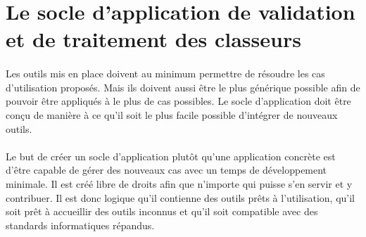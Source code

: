 \section{Le socle d'application de validation et de traitement des classeurs}
\label{sec:spreadsheet-framework}

\paragraph{}
Les outils mis en place doivent au minimum permettre de résoudre les cas d'utilisation proposés.
Mais ils doivent aussi être le plus générique possible afin de pouvoir être appliqués à le plus de cas possibles.
Le socle d'application doit être conçu de manière à ce qu'il soit le plus facile possible d'intégrer de nouveaux outils.

\paragraph{}
Le but de créer un socle d'application plutôt qu'une application concrète est d'être capable de gérer des nouveaux cas avec un temps de développement minimale.
Il est créé libre de droits afin que n'importe qui puisse s'en servir et y contribuer.
Il est donc logique qu'il contienne des outils prêts à l'utilisation, qu'il soit prêt à accueillir des outils inconnus et qu'il soit compatible avec des standards informatiques répandus.





